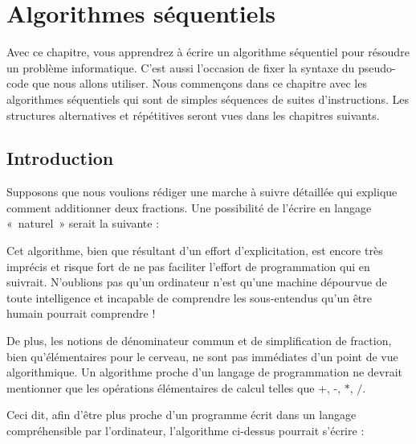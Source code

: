 
\chapter{Algorithmes séquentiels}

	Avec ce chapitre, vous apprendrez à écrire un algorithme séquentiel pour
	résoudre un problème informatique. C'est aussi
	l'occasion de fixer la syntaxe du pseudo-code que nous
	allons utiliser. Nous commençons dans ce chapitre avec les algorithmes
	séquentiels qui sont de simples séquences de suites
	d'instructions. Les structures alternatives et
	répétitives seront vues dans les chapitres suivants.


	\section{Introduction}

		Supposons que nous voulions rédiger une marche
		à suivre détaillée qui explique comment additionner deux fractions. Une
		possibilité de l’écrire en langage «~naturel~» serait la suivante :

		
		Cet algorithme, bien que résultant d’un effort
		d’explicitation, est encore très imprécis et risque fort de ne pas
		faciliter l’effort de programmation qui en suivrait. N’oublions pas
		qu’un ordinateur n’est qu’une machine dépourvue de toute intelligence
		et incapable de comprendre les sous-entendus qu’un être humain pourrait
		comprendre !

		De plus, les notions de dénominateur commun et
		de simplification de fraction, bien qu'élémentaires
		pour le cerveau, ne sont pas immédiates d'un point de
		vue algorithmique. Un algorithme proche d'un langage
		de programmation ne devrait mentionner que les opérations élémentaires
		de calcul telles que $+$, -, $*$, $/$.

		Ceci dit, afin d’être plus proche d’un
		programme écrit dans un langage compréhensible par l’ordinateur,
		l’algorithme ci-dessus pourrait s’écrire :


